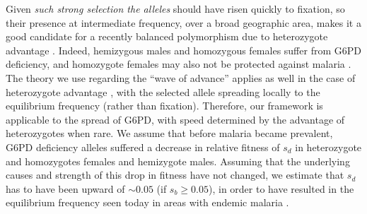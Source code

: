 \documentclass{article}
\newcommand{\mfp}[1]{{\it\color{red}#1}}
\begin{document}



Given \mfp{such strong selection the alleles} should have risen
quickly to fixation, so their presence at intermediate frequency,
over a broad geographic area, makes it a good candidate for a recently
balanced polymorphism due to heterozygote advantage \citep[note that
the conditions for a balanced polymorphism are
complicated by the hemizygosity of males, see][]{hedrick2011population, Pamillo:1979}. 
Indeed, hemizygous males and homozygous females suffer from G6PD deficiency,
and homozygote females may also not be protected against malaria \citep{manjurano_2015, malaria_network_2014}. 
The theory we use regarding the ``wave of advance'' \citep{fisher1937wave}
applies as well in the case of heterozygote advantage
\citep{aronson1975nonlinear}, with the selected allele spreading
locally to the equilibrium frequency (rather than fixation). 
Therefore, our framework is applicable to the spread of G6PD, with speed determined by the advantage of heterozygotes when rare.
We assume that before malaria became prevalent, 
G6PD deficiency alleles suffered a decrease in relative fitness of $s_d$ in heterozygote and homozygotes females and hemizygote males. 
Assuming that the underlying causes and strength of this drop in fitness have not changed, 
we estimate that $s_d$ has to have been upward of $\sim 0.05$ (if $s_b \geq 0.05$),
in order to have resulted in the equilibrium frequency seen today in
areas with endemic malaria \citep[based on heterozygote advantage
calculations for the X chromosome, results not shown, see also][]{Ruwende-g6pd}. 




\end{document}
